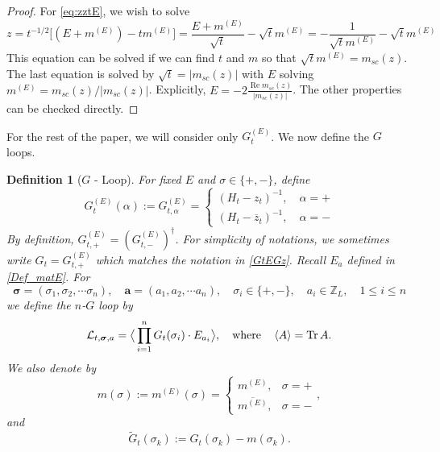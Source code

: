 \documentclass[10pt,reqno]{article}
\DeclareMathOperator{\re}{{\mathrm{Re}}}
\renewcommand{\bar}{\overline}
\DeclareMathOperator{\tr}{Tr}
\theoremstyle{plain} %
\newtheorem{definition}[theorem]{Definition}
\theoremstyle{remark}
\numberwithin{equation}{section}
\begin{document}
\begin{proof} For \eqref{eq:zztE}, 
we wish to solve 
\[
z=  t^{-1/2} \big [ (E+m^{(E)})- t  m^{(E)} \big ] =  \frac { E+m^{(E)}} { \sqrt t} - \sqrt  t  m^{(E)} = -  \frac { 1} {  \sqrt t m^{(E)} } -  \sqrt  t  m^{(E)}
\] 
This equation can be solved if  we can find $t$ and $m$ so that  $\sqrt  t  m^{(E)}= m_{sc} (z)$.
The last  equation is solved by $\sqrt t  = |m_{sc} (z)|$ with    $E$  solving   $m^{(E)}  = m_{sc} (z) / |m_{sc} (z) |$. Explicitly,  $E =  - 2 \frac {  \re  m_{sc} (z)} {  |m_{sc} (z) |}$. The other properties can be checked directly.  
\end{proof}
  

For the rest of the paper, we will consider only  $G_t^{(E)}$.  We now define the $G$ loops. 
\begin{definition}[$G$ - Loop]\label{Def:G_loop}
 For fixed $E$ and $\sigma\in \{+,-\}$,  define
 \begin{equation}\nonumber
  G^{(E)}_{t }(\alpha):=  G^{(E)}_{t,\alpha} =
   \begin{cases}
       (H_t-z_t)^{-1}, \quad \alpha=+\\
        (H_t-\bar z_t)^{-1}, \quad \alpha=-
   \end{cases}
 \end{equation}
By definition, $G^{(E)}_{t,+} =\left(G^{(E)}_{t,-}\right)^\dagger$. 
For simplicity of notations,  we sometimes write 
$G_t=G^{(E)}_{t,+}$  which matches the notation in \eqref{GtEGz}.  Recall $E_a$  defined in \eqref{Def_matE}.  
For 
$$
\boldsymbol{\sigma}=(\sigma_1, \sigma_2, \cdots \sigma_n),\quad 
\boldsymbol{a}=(a_1, a_2, \cdots a_n)
,\quad \sigma_i \in \{+,-\}, \quad
a_i\in \mathbb Z_L, \quad 1\le i\le n
$$
we define the $n$-$G$ loop by 
\begin{equation}\label{Eq:defGLoop}
    {\cal L}_{t, \boldsymbol{\sigma}, \textbf{a}}=\big \langle \prod_{i=1}^n G_t(\sigma_i)\cdot E_{a_i}\big \rangle,\quad 
\text{where} \quad \left\langle A\right\rangle=\tr A.
\end{equation}
We also denote by 
\begin{equation}\label{def_mtzk}
m (\sigma ):=m^{(E)}(\sigma ) = \begin{cases}
     m^{(E)}, & \sigma  =+ \\
     \overline{m^{(E)}} , & \sigma = -
\end{cases},
\end{equation}
and
\begin{equation}\label{Eq:defwtG}
 \widetilde{G}_t(\sigma_k) := G_t(\sigma_k) - m (\sigma_k) .
\end{equation}
\end{definition}
\end{document}
